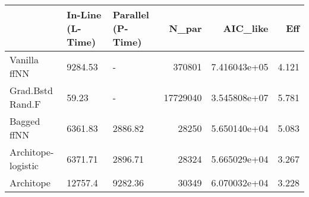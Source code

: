\begin{tabular}{lllrrr}
\toprule
{} & In-Line (L-Time) & Parallel (P-Time) &     N\_par &      AIC\_like &    Eff \\
\midrule
Vanilla ffNN       &          9284.53 &                 - &    370801 &  7.416043e+05 &  4.121 \\
Grad.Bstd Rand.F   &            59.23 &                 - &  17729040 &  3.545808e+07 &  5.781 \\
Bagged ffNN        &          6361.83 &           2886.82 &     28250 &  5.650140e+04 &  5.083 \\
Architope-logistic &          6371.71 &           2896.71 &     28324 &  5.665029e+04 &  3.267 \\
Architope          &          12757.4 &           9282.36 &     30349 &  6.070032e+04 &  3.228 \\
\bottomrule
\end{tabular}
